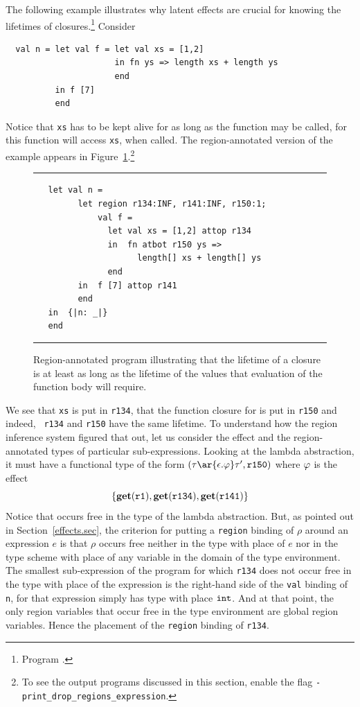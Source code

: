 \documentclass[12pt]{book}
\begin{document}
The following example illustrates why latent effects are crucial for
knowing the lifetimes of closures.\footnote{Program
  .} Consider
\begin{verbatim}
  val n = let val f = let val xs = [1,2]
                      in fn ys => length xs + length ys
                      end
          in f [7]
          end
\end{verbatim}
Notice that {\tt xs} has to be kept alive for as long as the function
 may be called, for this function will
access {\tt xs}, when called.  The region-annotated version of the
example appears in Figure~\ref{lambda1.fig}.\footnote{To see the
  output programs discussed in this section, enable the flag
  \texttt{-print\_drop\_regions\_expression}.}
\begin{figure}
\hrule \medskip
\begin{verbatim}
   let val n =
         let region r134:INF, r141:INF, r150:1;
             val f =
               let val xs = [1,2] attop r134
               in  fn atbot r150 ys =>
                     length[] xs + length[] ys
               end
         in  f [7] attop r141
         end
   in  {|n: _|}
   end
\end{verbatim}
\caption{Region-annotated program illustrating that the lifetime of
  a closure is at least as long as the lifetime of the values that
  evaluation of the function body will require.}  \medskip \hrule
\label{lambda1.fig}
\end{figure}
We see that {\tt xs} is put in {\tt r134}, that the function closure
for  is put in {\tt r150} and indeed, {\tt
  r134} and {\tt r150} have the same lifetime. To understand how the
region inference system figured that out, let us consider the effect
and the region-annotated types of particular sub-expressions. Looking
at the lambda abstraction, it must have a functional type of the form
$(\tau\ar{\epsilon.\rea}\tau', {\tt r150})$ where $\varphi$ is the effect
$$\{\mathop{\bf get}\nolimits(\hbox{\tt r1}), \mathop{\bf get}\nolimits(\hbox{\tt r134}), \mathop{\bf get}\nolimits(\hbox{\tt r141})\}$$
Notice
that  occurs free in the type of the lambda abstraction.
But, as pointed out in Section~\ref{effects.sec}, the criterion
%
for putting a {\tt region} binding of $\rho$ around an expression
$e$ is that $\rho$ occurs free neither in the type with place of $e$
nor in the type scheme with place of any variable in the domain of the
type environment. The smallest sub-expression of the program for which
{\tt r134} does not occur free in the type with place of the expression
is the right-hand side of the {\tt val} binding of {\tt n}, for that
expression simply has type with place $\hbox{\tt int}$.  And at that
point, the only region variables that occur free in the type
environment are global region variables.  Hence the placement of the
{\tt region} binding of {\tt r134}.
\end{document}
